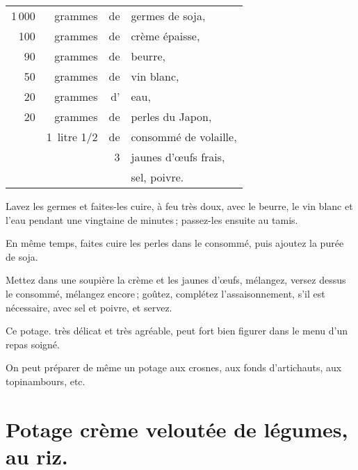 \footnotesize
\begin{longtable}{rrrp{16em}}                                                    
   1 000 & grammes   & de & germes de soja,                                                               \\
     100 & grammes   & de & crème épaisse,                                                                \\
      90 & grammes   & de & beurre,                                                                       \\
      50 & grammes   & de & vin blanc,                                                                    \\
      20 & grammes   & d' & eau,                                                                          \\
      20 & grammes   & de & perles du Japon,                                                              \\
       & 1 litre 1/2 & de & consommé de volaille,                                                         \\
         &           &  3 & jaunes d'œufs frais,                                                          \\
         &           &    & sel, poivre.                                                                  \\
\end{longtable}
\normalsize
                     
Lavez les germes et faites-les cuire, à feu très doux, avec le beurre, le vin
blanc et l’eau pendant une vingtaine de minutes ; passez-les ensuite au tamis.

En même temps, faites cuire les perles dans le consommé, puis ajoutez la purée
de soja.

Mettez dans une soupière la crème et les jaunes d'œufs, mélangez, versez dessus
le consommé, mélangez encore ; goûtez, complétez l'assaisonnement, s'il est
nécessaire, avec sel et poivre, et servez.

Ce potage. très délicat et très agréable, peut fort bien figurer dans le menu
d'un repas soigné.

\sk

On peut préparer de même un potage aux crosnes, aux fonds d'artichauts, aux
topinambours, etc.

\section*{\centering Potage crème veloutée de légumes, au riz.}


